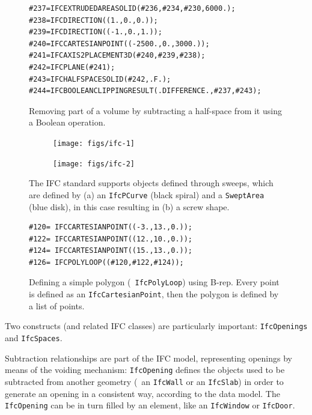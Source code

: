 \begin{figure}
\begin{lstlisting}[frame=single]
#237=IFCEXTRUDEDAREASOLID(#236,#234,#230,6000.);
#238=IFCDIRECTION((1.,0.,0.));
#239=IFCDIRECTION((-1.,0.,1.));
#240=IFCCARTESIANPOINT((-2500.,0.,3000.));
#241=IFCAXIS2PLACEMENT3D(#240,#239,#238);
#242=IFCPLANE(#241);
#243=IFCHALFSPACESOLID(#242,.F.);
#244=IFCBOOLEANCLIPPINGRESULT(.DIFFERENCE.,#237,#243);
\end{lstlisting}
\caption{Removing part of a volume by subtracting a half-space from it using a Boolean operation.}%
\label{fig:csg}
\end{figure}

\begin{figure}
\centering
\begin{subfigure}[b]{0.45\linewidth}
	\texttt{[image: figs/ifc-1]}%
	\label{subfig:ifc-1}
\end{subfigure}
\begin{subfigure}[b]{0.45\linewidth}
	\texttt{[image: figs/ifc-2]}%
	\label{subfig:ifc-2}
\end{subfigure}
\caption{The IFC standard supports objects defined through sweeps, which are defined by (a) an \texttt{IfcPCurve} (black spiral) and a \texttt{SweptArea} (blue disk), in this case resulting in (b) a screw shape.}%
\label{fig:sweeps}
\end{figure}

\begin{figure}
\begin{lstlisting}[frame=single]
#120= IFCCARTESIANPOINT((-3.,13.,0.));
#122= IFCCARTESIANPOINT((12.,10.,0.));
#124= IFCCARTESIANPOINT((15.,13.,0.));
#126= IFCPOLYLOOP((#120,#122,#124));
\end{lstlisting}
\caption{Defining a simple polygon (\ie\ \texttt{IfcPolyLoop}) using B-rep.
Every point is defined as an \texttt{IfcCartesianPoint}, then the polygon is defined by a list of points.}%
\label{fig:brep}
\end{figure}


Two constructs (and related IFC classes) are particularly important: \texttt{IfcOpenings} and \texttt{IfcSpaces}.

Subtraction relationships are part of the IFC model, representing openings by means of the voiding mechanism:
\texttt{IfcOpening} defines the objects used to be subtracted from another geometry (\eg\ an \texttt{IfcWall} or an \texttt{IfcSlab}) in order to generate an opening in a consistent way, according to the data model.
The \texttt{IfcOpening} can be in turn filled by an element, like an \texttt{IfcWindow} or \texttt{IfcDoor}.

